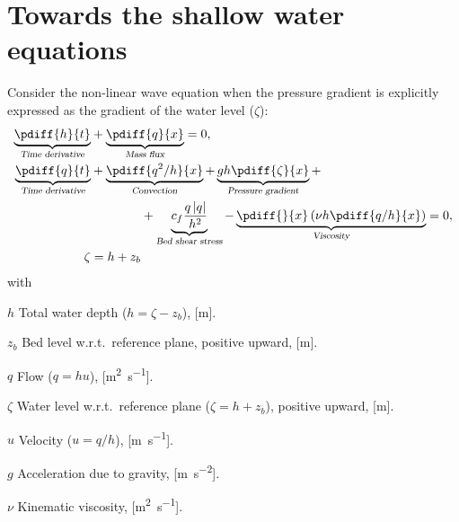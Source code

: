 \chapter{Towards the shallow water equations}\label{sec:1d_swe}
Consider the non-linear wave equation when the pressure gradient is explicitly expressed as the gradient of the water level ($\zeta$):
\begin{subequations}
    \begin{align}
        \underbrace{\pdiff{h}{t}}_{\textsl{Time derivative}} &  +
        \underbrace{\pdiff{q}{x}}_{\textsl{Mass flux}} =0,
        \\
        \underbrace{\pdiff{q}{t}}_{\textsl{Time derivative}} & +
        \underbrace{\pdiff{q^2/h}{x}}_{\textsl{Convection}} +
        \underbrace{gh \pdiff{\zeta}{x}}_{\textsl{Pressure gradient}} +
        \nonumber \\*
        & \qquad \qquad +
        \underbrace{c_f\frac{q\abs{q}}{h^2}}_{\textsl{Bed shear stress}}
        -\underbrace{\pdiff{}{x}\left( \nu h \pdiff{q/h}{x}\right)}_{\textsl{Viscosity}} = 0,
        \\
        \zeta & = h + z_b
    \end{align}
    \label{eq:1d_non_linear_wave2}
\end{subequations}
%
with
\begin{symbollist}
    \item[$h$] Total water depth ($h = \zeta - z_b$), [\si{\metre}].
    \item[$z_b$] Bed level w.r.t.\ reference plane, positive upward, [\si{\metre}].
    \item[$q$] Flow ($q = hu$), [\si{\square\metre\per\second}].
    \item[$\zeta$] Water level w.r.t.\ reference plane ($\zeta = h + z_b$), positive upward, [\si{\metre}].
    \item[$u$] Velocity ($u = q/h$), [\si{\metre\per\second}].
    \item[$g$] Acceleration due to gravity, [\si{\metre\per\square\second}].
    \item[$\nu$] Kinematic viscosity, [\si{\square\metre\per\second}].
\end{symbollist}

